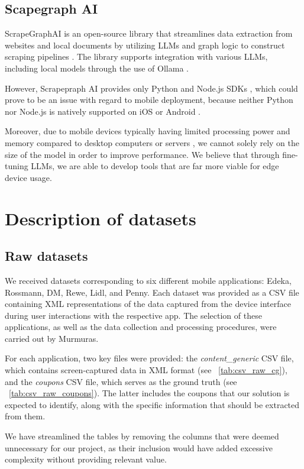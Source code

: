 \documentclass[licencjacka,en]{pracamgr}
\begin{document}
\section{Scapegraph AI}
ScrapeGraphAI is an open-source library that streamlines data extraction from websites and local documents by utilizing LLMs and graph logic to construct scraping pipelines \cite{scapegraph_repo}. The library supports integration with various LLMs, including local models through the use of Ollama \cite{ollama_repo} \cite{scapegraph_usage}.

However, Scrapepraph AI provides only Python and Node.js SDKs \cite{scapegraph_sdks}, which could prove to be an issue with regard to mobile deployment, because neither Python nor Node.js is natively supported on iOS or Android \cite{android_dev_site} \cite{ios_dev_site}.

Moreover, due to mobile devices typically having limited processing power and memory compared to desktop computers or servers \cite{mobile_resources}, we cannot solely rely on the size of the model in order to improve performance. We believe that through fine-tuning LLMs, we are able to develop tools that are far more viable for edge device usage.

\chapter{Description of datasets}
\section{Raw datasets} 
We received datasets corresponding to six different mobile applications: Edeka, Rossmann, DM, Rewe, Lidl, and Penny. Each dataset was provided as a CSV file containing XML representations of the data captured from the device interface during user interactions with the respective app. The selection of these applications, as well as the data collection and processing procedures, were carried out by Murmuras.

For each application, two key files were provided: the \textit{content\_generic} CSV file, which contains screen-captured data in XML format (see ~\ref{tab:csv_raw_cg}), and the \textit{coupons} CSV file, which serves as the ground truth (see ~\ref{tab:csv_raw_coupons}). The latter includes the coupons that our solution is expected to identify, along with the specific information that should be extracted from them. 

We have streamlined the tables by removing the columns that were deemed unnecessary for our project, as their inclusion would have added excessive complexity without providing relevant value.
\end{document}
